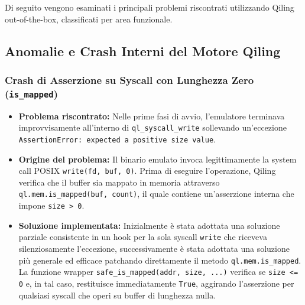 \documentclass[11pt,a4paper]{article}
\begin{document}
Di seguito vengono esaminati i principali problemi riscontrati utilizzando Qiling out-of-the-box, classificati per area funzionale.

\subsection{Anomalie e Crash Interni del Motore Qiling}

\subsubsection{Crash di Asserzione su Syscall con Lunghezza Zero (\texttt{is\_mapped})}
\begin{itemize}
    \item \textbf{Problema riscontrato:} Nelle prime fasi di avvio, l'emulatore terminava improvvisamente all'interno di \texttt{ql\_syscall\_write} sollevando un'eccezione \texttt{AssertionError: expected a positive size value}.
    \item \textbf{Origine del problema:} Il binario emulato invoca legittimamente la system call POSIX \texttt{write(fd, buf, 0)}. Prima di eseguire l'operazione, Qiling verifica che il buffer sia mappato in memoria attraverso \texttt{ql.mem.is\_mapped(buf, count)}, il quale contiene un'asserzione interna che impone \texttt{size > 0}.
    \item \textbf{Soluzione implementata:} Inizialmente è stata adottata una soluzione parziale consistente in un hook per la sola syscall \texttt{write} che riceveva silenziosamente l'eccezione, successivamente è stata adottata una soluzione più generale ed efficace patchando direttamente il metodo \texttt{ql.mem.is\_mapped}. La funzione wrapper \texttt{safe\_is\_mapped(addr, size, ...)} verifica se \texttt{size <= 0} e, in tal caso, restituisce immediatamente \texttt{True}, aggirando l'asserzione per qualsiasi syscall che operi su buffer di lunghezza nulla.
\end{itemize}
\end{document}
